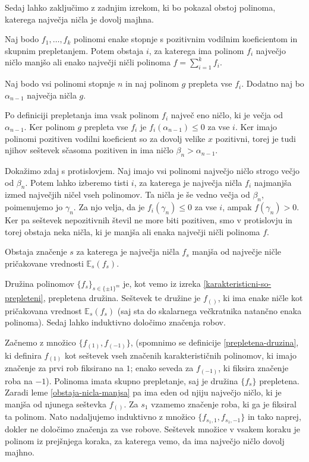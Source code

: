 Sedaj lahko zaključimo z zadnjim izrekom, ki bo pokazal obstoj polinoma, katerega največja ničla je dovolj majhna.

\begin{lema}\label{obstaja-nicla-manjsa}
    Naj bodo \(f_1, \ldots, f_k\) polinomi enake stopnje s pozitivnim vodilnim koeficientom in skupnim prepletanjem. Potem obstaja \(i\), za katerega ima polinom \(f_i\) največjo ničlo manjšo ali enako največji ničli polinoma \(f=\sum_{i=1}^k f_i\).
\end{lema}
\begin{dokaz}
    Naj bodo vsi polinomi stopnje \(n\) in naj polinom \(g\) prepleta vse \(f_i\). Dodatno naj bo \(\alpha_{n-1}\) največja ničla \(g\).
    
    Po definiciji prepletanja ima vsak polinom \(f_i\) največ eno ničlo, ki je večja od \(\alpha_{n-1}\). Ker polinom \(g\) prepleta vse \(f_i\) je \(f_i(\alpha_{n-1})\leq0\) za vse \(i\). Ker imajo polinomi pozitiven vodilni koeficient so za dovolj velike \(x\) pozitivni, torej je tudi njihov seštevek sčasoma pozitiven in ima ničlo \(\beta_n > \alpha_{n-1}\).

    Dokažimo zdaj s protislovjem. Naj imajo vsi polinomi največjo ničlo strogo večjo od \(\beta_n\). Potem lahko izberemo tisti \(i\), za katerega je največja ničla \(f_i\) najmanjša izmed največjih ničel vseh polinomov. Ta ničla je še vedno večja od \(\beta_n\), poimenujemo jo \(\gamma_n\). Za njo velja, da je \(f_i(\gamma_n) \leq 0\) za vse \(i\), ampak \(f(\gamma_n) > 0\). Ker pa seštevek nepozitivnih števil ne more biti pozitiven, smo v protislovju in torej obstaja neka ničla, ki je manjša ali enaka največji ničli polinoma \(f\).
\end{dokaz}

\begin{izrek}
    Obstaja značenje \(s\) za katerega je največja ničla \(f_s\) manjša od največje ničle pričakovane vrednosti \(\mathbb E_{s}(f_s)\).
\end{izrek}
\begin{dokaz}
    Družina polinomov \(\{f_s\}_{s\in\{\pm1\}^m}\) je, kot vemo iz izreka \ref{karakteristicni-so-prepleteni}, prepletena družina. Seštevek te družine je \(f_{()}\), ki ima enake ničle kot pričakovana vrednost \(\mathbb E_{s}(f_s)\) (saj sta do skalarnega večkratnika natančno enaka polinoma). Sedaj lahko induktivno določimo značenja robov.

    Začnemo z množico \(\{f_{(1)}, f_{(-1)}\}\), (spomnimo se definicije \ref{prepletena-druzina}, ki definira \(f_{(1)}\) kot seštevek vseh značenih karakterističnih polinomov, ki imajo značenje za prvi rob fiksirano na \(1\); enako seveda za \(f_{(-1)}\), ki fiksira značenje roba na \(-1\)). Polinoma imata skupno prepletanje, saj je družina \(\{f_s\}\) prepletena. Zaradi leme \ref{obstaja-nicla-manjsa} pa ima eden od njiju največjo ničlo, ki je manjša od njunega seštevka \(f_{()}\). Za \(s_1\) vzamemo značenje roba, ki ga je fiksiral ta polinom. Nato nadaljujemo induktivno z množico \(\{f_{s_1, 1}, f_{s_1, -1}\}\) in tako naprej, dokler ne določimo značenja za vse robove. Seštevek množice v vsakem koraku je polinom iz prejšnjega koraka, za katerega vemo, da ima največjo ničlo dovolj majhno. 
\end{dokaz}

